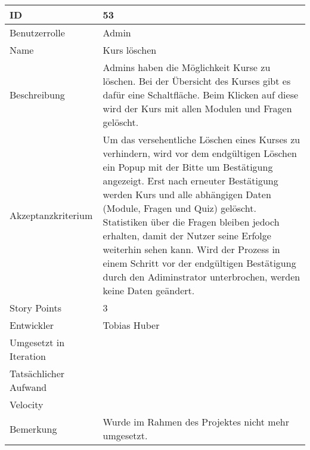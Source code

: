 \begin{tabularx}{\textwidth}{|p{}|X|}
	\hline
	ID & 53\\
	\hline
	Benutzerrolle & Admin\\
	\hline
	Name & Kurs löschen\\
	\hline
	Beschreibung & Admins haben die Möglichkeit Kurse zu löschen. Bei der Übersicht des Kurses
	gibt es dafür eine Schaltfläche. Beim Klicken auf diese wird der Kurs mit allen Modulen
	und Fragen gelöscht.\\
	\hline
	Akzeptanzkriterium & Um das versehentliche Löschen eines Kurses zu verhindern, wird vor dem
	endgültigen Löschen ein Popup mit der Bitte um Bestätigung angezeigt. Erst nach erneuter
	Bestätigung werden Kurs und alle abhängigen Daten (Module, Fragen und Quiz) gelöscht.
	Statistiken über die Fragen bleiben jedoch erhalten, damit der Nutzer seine Erfolge
	weiterhin sehen kann. Wird der Prozess in einem Schritt vor der endgültigen Bestätigung
	durch den Adiminstrator unterbrochen, werden keine Daten geändert.\\
	\hline
	Story Points & 3\\
	\hline
	Entwickler & Tobias Huber\\
	\hline
	Umgesetzt in Iteration & \\
	\hline
	Tatsächlicher Aufwand & \\
	\hline
	Velocity & \\
	\hline
	Bemerkung & Wurde im Rahmen des Projektes nicht mehr umgesetzt.\\
	\hline
\end{tabularx}
\vspace{20pt}
